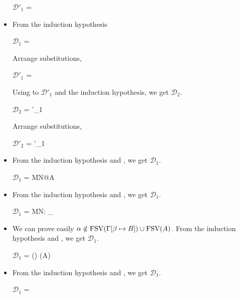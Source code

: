 \begin{itemize}
	$\mathcal{D}'_1$ = 
	{ \andalso {}}

	\item \QApp

	From the induction hypothesis

	$\mathcal{D}_1$ = 

	Arrange substitutions,

	$\mathcal{D}'_1$ = 

	Using \QApp to $\mathcal{D}'_1$ and the induction hypothesis, we get $\mathcal{D}_2$.

	$\mathcal{D}_2$ = 
	{'_1 \andalso {}}

	Arrange substitutions,

	$\mathcal{D}'_2$ = 
	{'_1 \andalso {}}

	\item \QTB

	From the induction hypothesis and \QTB, we get $\mathcal{D}_1$.

	$\mathcal{D}_1$ = 
	{\GGV M\SB \E N\SB @A\alpha}

	\item \QTBL

	From the induction hypothesis and \QTBL, we get $\mathcal{D}_1$.

	$\mathcal{D}_1$ = 
	{\GGV M\SB \E N\SB : \TW_\alpha \tau@A}

	\item \QGen

	We can prove easily $\alpha \notin \text{FSV}(\Gamma[\beta \mapsto B]) \cup \text{FSV}(A)$.
	From the induction hypothesis and \QGen, we get $\mathcal{D}_1$.

	$\mathcal{D}_1$ = 
	{ \andalso \alpha \notin \FTV(\GG) \cup \FTV(A)}

	\item \QIns

	From the induction hypothesis and \QIns, we get $\mathcal{D}_1$.

	$\mathcal{D}_1$ = 
	{}


\end{itemize}
